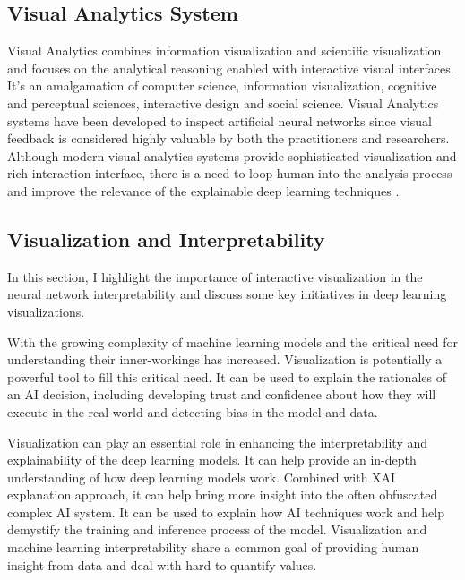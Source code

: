 \subsection{Visual Analytics System}
    
Visual Analytics combines information visualization and scientific visualization and focuses on the analytical reasoning enabled with interactive visual interfaces. It’s an amalgamation of computer science, information visualization, cognitive and perceptual sciences, interactive design and social science. Visual Analytics systems have been developed to inspect artificial neural networks since visual feedback is considered highly valuable by both the practitioners and researchers. Although modern visual analytics systems provide sophisticated visualization and rich interaction interface, there is a need to loop human into the analysis process and improve the relevance of the explainable deep learning techniques \cite{Choo2018}.

\subsection{Visualization and Interpretability}

In this section, I highlight the importance of interactive visualization in the neural network interpretability and discuss some key initiatives in deep learning visualizations. 

With the growing complexity of machine learning models and the critical need for understanding their inner-workings has increased. Visualization is potentially a powerful tool to fill this critical need. It can be used to explain the rationales of an AI decision, including developing trust and confidence about how they will execute in the real-world and detecting bias in the model and data.

Visualization can play an essential role in enhancing the interpretability and explainability of the deep learning models. It can help provide an in-depth understanding of how deep learning models work. Combined with XAI explanation approach, it can help bring more insight into the often obfuscated complex AI system. It can be used to explain how AI techniques work and help demystify the training and inference process of the model.
Visualization and machine learning interpretability share a common goal of providing human insight from data and deal with hard to quantify values.

